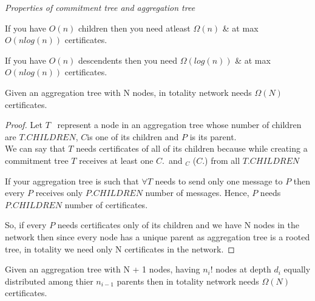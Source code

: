 \textit{Properties of commitment tree and aggregation tree}

	If you have $O(n)$ children then you need atleast $\Omega(n)$ \& at max $O(nlog(n))$ certificates.

	If you have $O(n)$ descendents then you need $\Omega(log(n))$  \& at max $O(nlog(n))$ certificates.


\begin{theorem} \label{min certificates}
	Given an aggregation tree with N nodes, in totality network needs $\Omega(N)$ certificates.
\end{theorem}

\begin{proof}
	
	Let $T$ \ represent a node in an aggregation tree whose number of children are $T$.$CHILDREN$, $C$is one of its children and $P$ is its parent.\\
	We can say that $T$ needs certificates of all of its children because while creating a commitment tree $T$ receives at least one $C$.\msg \ and \sign$_{C}$ ($C$.\msg)  from all $T$.$CHILDREN$

	If your aggregation tree is such that $\forall T$ needs to send only one message to $P$ then every $P$ receives only $P.CHILDREN$ number of messages. Hence, $P$ needs $P.CHILDREN$ number of certificates.

	So, if every $P$ needs certificates only of its children  and we have N nodes in the network then since every node has a unique parent as aggregation tree is a rooted tree, in totality we need only N certificates in the network.

\end{proof}


\begin{theorem}
	Given an aggregation tree with N + 1 nodes, having $n_{i}!$ nodes at depth $d_{i}$ equally distributed among thier $n_{i-1}$ parents then in totality network needs $\Omega(N)$ certificates.
\end{theorem}

